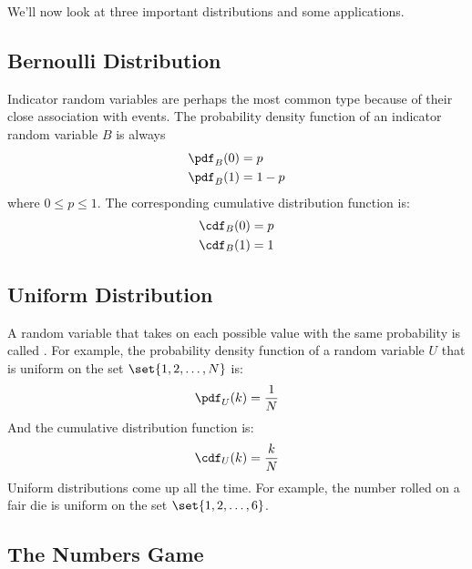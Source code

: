 We'll now look at three important distributions and some applications.

\subsection{Bernoulli Distribution}

Indicator random variables are perhaps the most common type because of
their close association with events.  The probability density function
of an indicator random variable $B$ is always
%
\begin{align*}
\pdf_B(0) & = p \\
\pdf_B(1) & = 1 - p \\
\end{align*}
%
where $0 \leq p \leq 1$.  The corresponding cumulative distribution
function is:
%
\begin{align*}
\cdf_B(0) & = p \\
\cdf_B(1) & = 1
\end{align*}
%

\subsection{Uniform Distribution}

A random variable that takes on each possible value with the same
probability is called .  For example, the probability
density function of a random variable $U$ that is uniform on the set
$\set{1, 2, \dots, N}$ is:
%
\begin{align*}
\pdf_U(k) = \frac{1}{N}
\end{align*}
%
And the cumulative distribution function is:
%
\begin{align*}
\cdf_U(k) = \frac{k}{N}
\end{align*}
%
Uniform distributions come up all the time.  For example, the number
rolled on a fair die is uniform on the set $\set{1, 2, \dots, 6}$.

\iffalse

\subsection{The Numbers Game}

